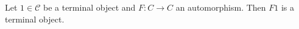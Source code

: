Let $1 \in \mathcal{C}$ be a terminal object and $F\colon C\to C$ an
automorphism. Then $F1$ is a terminal object.
